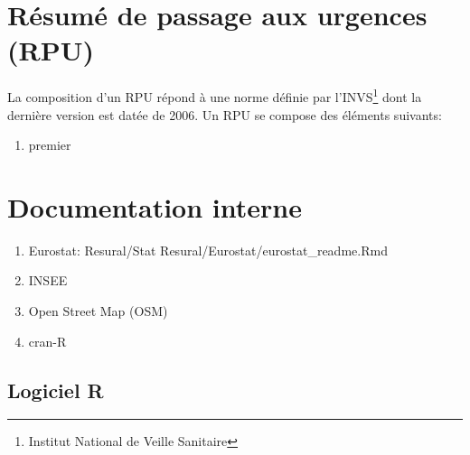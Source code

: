 \documentclass[12pt,english,french]{report}
\begin{document}
\chapter{Résumé de passage aux urgences (RPU)}
La composition d'un RPU répond à une norme définie par l'INVS\footnote{Institut National de Veille Sanitaire} dont la dernière version est datée de 2006. Un RPU se compose des éléments suivants:
\begin{enumerate}
  \item premier
\end{enumerate}

\chapter{Documentation interne}
\begin{enumerate}
  \item Eurostat: Resural\//Stat Resural\//Eurostat\//eurostat\_readme.Rmd
  \item INSEE
  \item Open Street Map (OSM)
  \item cran-R
\end{enumerate}

\section{Logiciel R}


\printindex
\end{document}
